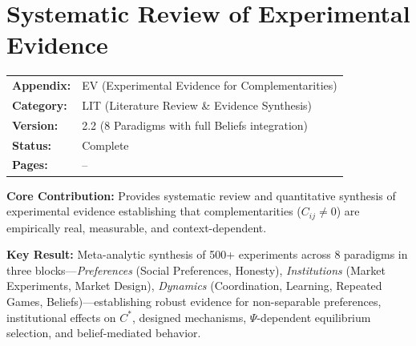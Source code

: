 
\section{Systematic Review of Experimental Evidence}
\label{app:experimental-evidence}


\begin{tcolorbox}[colback=blue!5!white, colframe=blue!75!black,
    title=\textbf{Appendix EV: LIT-EVIDENCE}]

\begin{tabular}{@{}ll@{}}
\textbf{Appendix:} & EV (Experimental Evidence for Complementarities) \\
\textbf{Category:} & LIT (Literature Review \& Evidence Synthesis) \\
\textbf{Version:} & 2.2 (8 Paradigms with full Beliefs integration) \\
\textbf{Status:} & Complete \\
\textbf{Pages:} & \pageref{app:experimental-evidence}--\pageref{sec:EV-footer} \\
\end{tabular}

\tcblower

\textbf{Core Contribution:} Provides systematic review and quantitative synthesis
of experimental evidence establishing that complementarities ($C_{ij} \neq 0$)
are empirically real, measurable, and context-dependent.

\textbf{Key Result:} Meta-analytic synthesis of 500+ experiments across 8
paradigms in three blocks---\emph{Preferences} (Social Preferences, Honesty),
\emph{Institutions} (Market Experiments, Market Design), \emph{Dynamics}
(Coordination, Learning, Repeated Games, Beliefs)---establishing robust evidence for
non-separable preferences, institutional effects on $C^*$, designed mechanisms,
$\Psi$-dependent equilibrium selection, and belief-mediated behavior.

\end{tcolorbox}

